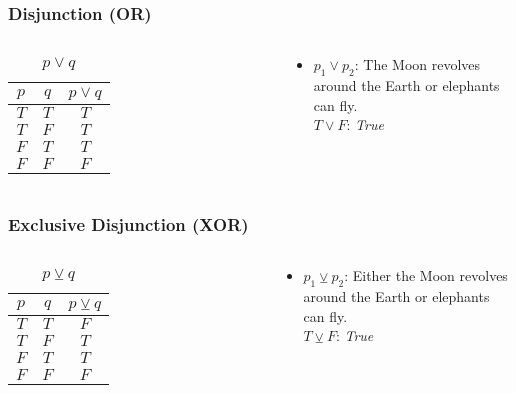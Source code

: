 \documentclass[dvipsnames]{beamer}
\begin{document}
\begin{frame}
  \frametitle{Disjunction (OR)}

  \begin{columns}
    \begin{table}
      \caption{$p \vee q$}
      \begin{tabular}{|c|c||c|}\hline
        $p$ & $q$ & $p \vee q$\\\hline\hline
        $T$ & $T$ & $T$\\\hline
        $T$ & $F$ & $T$\\\hline
        $F$ & $T$ & $T$\\\hline
        $F$ & $F$ & $F$\\\hline
      \end{tabular}
    \end{table}

    \pause
    \begin{example}
      \begin{itemize}
        \item $p_1 \vee p_2$: The Moon revolves around the Earth or elephants
          can fly.\\
          $T \vee F$: \emph{True}
      \end{itemize}
    \end{example}
  \end{columns}
\end{frame}

\begin{frame}
  \frametitle{Exclusive Disjunction (XOR)}

  \begin{columns}
    \begin{table}
      \caption{$p \veebar q$}
      \begin{tabular}{|c|c||c|}\hline
        $p$ & $q$ & $p \veebar q$\\\hline\hline
        $T$ & $T$ & $F$\\\hline
        $T$ & $F$ & $T$\\\hline
        $F$ & $T$ & $T$\\\hline
        $F$ & $F$ & $F$\\\hline
      \end{tabular}
    \end{table}

    \pause
    \begin{example}
      \begin{itemize}
        \item $p_1 \veebar p_2$: Either the Moon revolves around the Earth or
          elephants can fly.\\
          $T \veebar F$: \emph{True}
      \end{itemize}
    \end{example}
  \end{columns}
\end{frame}
\end{document}

